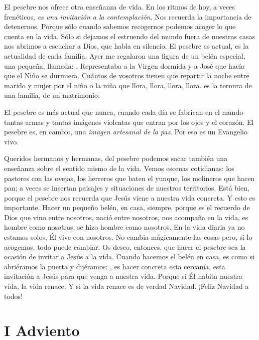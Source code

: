 El pesebre nos ofrece otra enseñanza de vida. En los ritmos de hoy, a veces frenéticos, \emph{es una invitación a la contemplación}. Nos recuerda la importancia de detenernos. Porque sólo cuando sabemos recogernos podemos acoger lo que cuenta en la vida. Sólo si dejamos el estruendo del mundo fuera de nuestras casas nos abrimos a escuchar a Dios, que habla en silencio. El pesebre es actual, es la actualidad de cada familia. Ayer me regalaron una figura de un belén especial, una pequeña, llamada: . Representaba a la Virgen dormida y a José que hacía que el Niño se durmiera. Cuántos de vosotros tienen que repartir la noche entre marido y mujer por el niño o la niña que llora, llora, llora, llora.  es la ternura de una familia, de un matrimonio.

El pesebre es más actual que nunca, cuando cada día se fabrican en el mundo tantas armas y tantas imágenes violentas que entran por los ojos y el corazón. El pesebre es, en cambio, una \emph{imagen artesanal de la paz}. Por eso es un Evangelio vivo.

Queridos hermanos y hermanas, del pesebre podemos sacar también una enseñanza sobre el sentido mismo de la vida. Vemos escenas cotidianas: los pastores con las ovejas, los herreros que baten el yunque, los molineros que hacen pan; a veces se insertan paisajes y situaciones de nuestros territorios. Está bien, porque el pesebre nos recuerda que Jesús viene a nuestra vida concreta. Y esto es importante. Hacer un pequeño belén, en casa, siempre, porque es el recuerdo de Dios que vino entre nosotros, nació entre nosotros, nos acompaña en la vida, es hombre como nosotros, se hizo hombre como nosotros. En la vida diaria ya no estamos solos, Él vive con nosotros. No cambia mágicamente las cosas pero, si lo acogemos, todo puede cambiar. Os deseo, entonces, que hacer el pesebre sea la ocasión de invitar a Jesús a la vida. Cuando hacemos el belén en casa, es como si abriéramos la puerta y dijéramos: , es hacer concreta esta cercanía, esta invitación a Jesús para que venga a nuestra vida. Porque si Él habita nuestra vida, la vida renace. Y si la vida renace es de verdad Navidad. ¡Feliz Navidad a todos!

\section{I Adviento}







